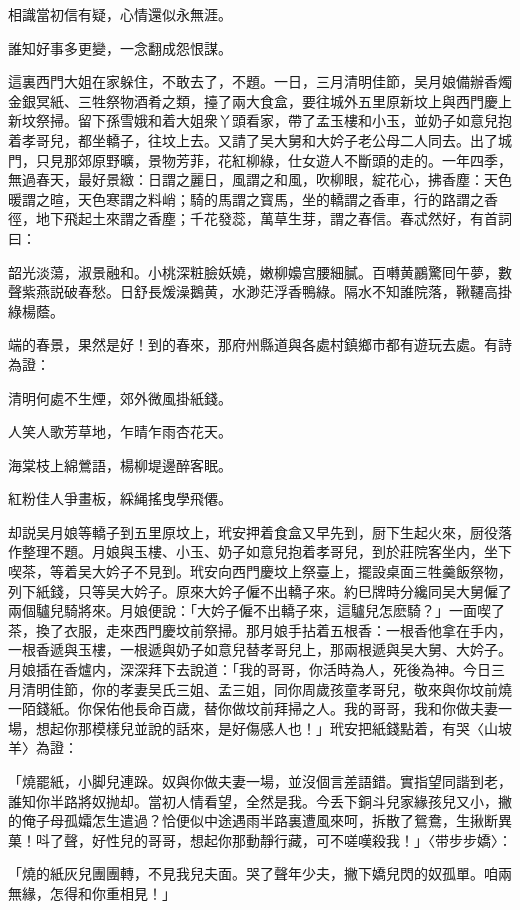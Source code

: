 相識當初信有疑，心情還似永無涯。

誰知好事多更變，一念翻成怨恨謀。

這裏西門大姐在家躲住，不敢去了，不題。一日，三月清明佳節，吴月娘備辦香燭金銀冥紙、三牲祭物酒肴之類，擡了兩大食盒，要往城外五里原新坟上與西門慶上新坟祭掃。留下孫雪娥和着大姐衆丫頭看家，帶了孟玉樓和小玉，並奶子如意兒抱着孝哥兒，都坐轎子，往坟上去。又請了吴大舅和大妗子老公母二人同去。出了城門，只見那郊原野曠，景物芳菲，花紅柳綠，仕女遊人不斷頭的走的。一年四季，無過春天，最好景緻：日謂之麗日，風謂之和風，吹柳眼，綻花心，拂香塵：天色暖謂之暄，天色寒謂之料峭；騎的馬謂之寳馬，坐的轎謂之香車，行的路謂之香徑，地下飛起土來謂之香塵；千花發蕊，萬草生芽，謂之春信。春忒然好，有首詞曰：

韶光淡蕩，淑景融和。小桃深粧臉妖嬈，嫩柳嬝宫腰細膩。百囀黄鸝驚囘午夢，數聲紫燕説破春愁。日舒長煖澡鵝黄，水渺茫浮香鴨綠。隔水不知誰院落，鞦韆高掛綠楊蔭。

端的春景，果然是好！到的春來，那府州縣道與各處村鎮鄉市都有遊玩去處。有詩為證：

清明何處不生煙，郊外微風掛紙錢。

人笑人歌芳草地，乍晴乍雨杏花天。

海棠枝上綿鶯語，楊柳堤邊醉客眠。

紅粉佳人爭畫板，綵䋲搖曳學飛僊。

却説吴月娘等轎子到五里原坟上，玳安押着食盒又早先到，厨下生起火來，厨役落作整理不題。月娘與玉樓、小玉、奶子如意兒抱着孝哥兒，到於莊院客坐内，坐下喫茶，等着吴大妗子不見到。玳安向西門慶坟上祭臺上，擺設桌面三牲羹飯祭物，列下紙錢，只等吴大妗子。原來大妗子僱不出轎子來。約巳牌時分纔同吴大舅僱了兩個驢兒騎將來。月娘便說：「大妗子僱不出轎子來，這驢兒怎麽騎？」一面喫了茶，換了衣服，走來西門慶坟前祭掃。那月娘手拈着五根香：一根香他拿在手内，一根香遞與玉樓，一根遞與奶子如意兒替孝哥兒上，那兩根遞與吴大舅、大妗子。月娘插在香爐内，深深拜下去說道：「我的哥哥，你活時為人，死後為神。今日三月清明佳節，你的孝妻吴氏三姐、孟三姐，同你周歲孩童孝哥兒，敬來與你坟前燒一陌錢紙。你保佑他長命百歲，替你做坟前拜掃之人。我的哥哥，我和你做夫妻一場，想起你那模樣兒並說的話來，是好傷感人也！」玳安把紙錢點着，有哭〈山坡羊〉為證：

「燒罷紙，小脚兒連跺。奴與你做夫妻一場，並沒個言差語錯。實指望同諧到老，誰知你半路將奴抛却。當初人情看望，全然是我。今丢下銅斗兒家緣孩兒又小，撇的俺子母孤孀怎生遣過？恰便似中途遇雨半路裏遭風來呵，拆散了鴛鴦，生揪断異菓！呌了聲，好性兒的哥哥，想起你那動靜行藏，可不嗟嘆殺我！」〈带步步嬌〉：

「燒的紙灰兒團團轉，不見我兒夫面。哭了聲年少夫，撇下嬌兒閃的奴孤單。咱兩無緣，怎得和你重相見！」

